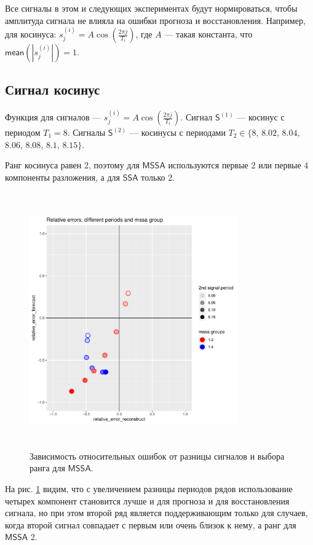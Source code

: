 \documentclass[specialist, substylefile = spbureport.rtx,
    subf,href,colorlinks=true, 12pt]{disser}
\newcommand{\sfS}{\mathsf{S}}
\newcommand{\SSA}{\mathsf{SSA}}
\newcommand{\MSSA}{\mathsf{MSSA}}
\newcommand{\mean}{\mathsf{mean}}
\begin{document}
        Все сигналы в этом и следующих экспериментах будут нормироваться, чтобы амплитуда сигнала не влияла на ошибки прогноза и восстановления. Например, для косинуса: $s_j^{(i)} = A \cos(\frac{2\pi j}{T_i})$, где $A$ --- такая константа, что $\mean(|s_j^{(i)}|) = 1$.


    \subsection{Сигнал косинус}
        Функция для сигналов --- $s^{(i)}_j = A \cos(\frac{2\pi j}{T_i})$.
        Сигнал $\sfS^{(1)}$ --- косинус с периодом $T_1 = 8$.
        Сигналы $\sfS^{(2)}$ --- косинусы с периодами $T_2 \in \{8$, $8.02$, $8.04$, $8.06$, $8.08$, $8.1$, $8.15\}$.

        Ранг косинуса равен 2, поэтому для $\MSSA$ используются первые 2 или первые 4 компоненты разложения, а для $\SSA$ только 2.

        \begin{figure}[h]
            \centering
            \includegraphics[height=11cm, width=0.8\textwidth]{experiment_1_cos.pdf}
            \caption{Зависимость относительных ошибок от разницы сигналов и выбора ранга для $\MSSA$.}
            \label{fig:exp1_cos}
        \end{figure}

        На рис. \ref{fig:exp1_cos} видим, что с увеличением разницы периодов рядов использование четырех компонент становится лучше и для прогноза и для восстановления сигнала, но при этом второй ряд является поддерживающим только для случаев, когда второй сигнал совпадает с первым или очень близок к нему, а ранг для $\MSSA$ 2.
\end{document}

